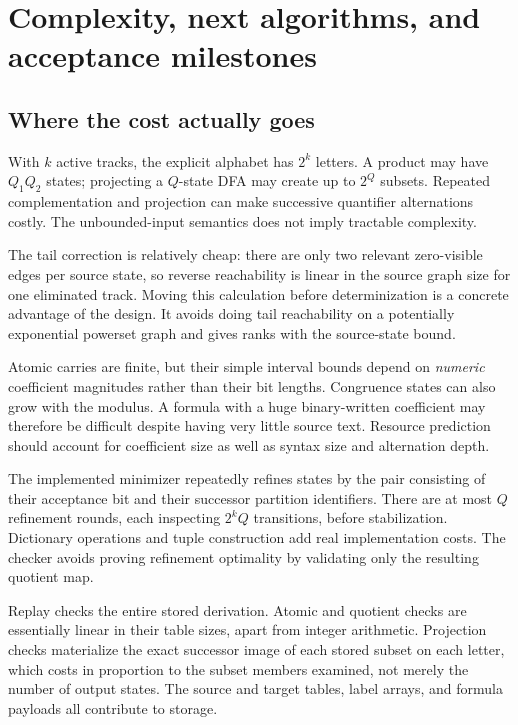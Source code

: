 \section{Complexity, next algorithms, and acceptance milestones}\label{sec:next}

\subsection{Where the cost actually goes}
With \(k\) active tracks, the explicit alphabet has \(2^k\) letters. A product may have \(Q_1Q_2\) states; projecting a \(Q\)-state DFA may create up to \(2^Q\) subsets. Repeated complementation and projection can make successive quantifier alternations costly. The unbounded-input semantics does not imply tractable complexity.

The tail correction is relatively cheap: there are only two relevant zero-visible edges per source state, so reverse reachability is linear in the source graph size for one eliminated track. Moving this calculation before determinization is a concrete advantage of the design. It avoids doing tail reachability on a potentially exponential powerset graph and gives ranks with the source-state bound.

Atomic carries are finite, but their simple interval bounds depend on \emph{numeric} coefficient magnitudes rather than their bit lengths. Congruence states can also grow with the modulus. A formula with a huge binary-written coefficient may therefore be difficult despite having very little source text. Resource prediction should account for coefficient size as well as syntax size and alternation depth.

The implemented minimizer repeatedly refines states by the pair consisting of their acceptance bit and their successor partition identifiers. There are at most \(Q\) refinement rounds, each inspecting \(2^k Q\) transitions, before stabilization. Dictionary operations and tuple construction add real implementation costs. The checker avoids proving refinement optimality by validating only the resulting quotient map.

Replay checks the entire stored derivation. Atomic and quotient checks are essentially linear in their table sizes, apart from integer arithmetic. Projection checks materialize the exact successor image of each stored subset on each letter, which costs in proportion to the subset members examined, not merely the number of output states. The source and target tables, label arrays, and formula payloads all contribute to storage.

